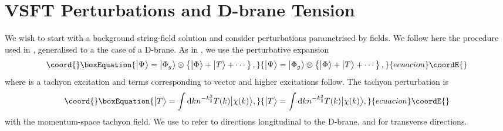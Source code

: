 \documentclass[letterpaper,12pt]{article}
\providecommand{\td}{\textup{d}}
\begin{document}
\section{VSFT Perturbations and D\coordHE{}-brane Tension}
\label{VSFTP}
We wish to start with a background string-field solution \coordHE{} 
and consider perturbations parametrised by fields. We follow here the procedure used 
in \cite{RV}, generalised to a the case of a D\coordHE{}-brane.
 As in \cite{RSZ6}, we use the perturbative expansion
\begin{equation}\coord{}\boxEquation{
\big| \Psi \big\rangle =  \big| \Phi_g \big\rangle \otimes
        \left\{
          \big|\Phi \big\rangle + \big|T\big\rangle + \cdots
        \right\}
,}{
\big| \Psi \big\rangle =  \big| \Phi_g \big\rangle \otimes
        \left\{
          \big|\Phi \big\rangle + \big|T\big\rangle + \cdots
        \right\}
,}{ecuacion}\coordE{}\end{equation}
where \coordHE{} is a tachyon excitation and terms corresponding to vector 
and higher excitations follow.
The tachyon perturbation is
\begin{equation}\coord{}\boxEquation{
 \big|T\big\rangle = \int \td k n^{-k_\parallel^2} T(k) \big|\chi(k)\big\rangle 
,}{
 \big|T\big\rangle = \int \td k n^{-k_\parallel^2} T(k) \big|\chi(k)\big\rangle 
,}{ecuacion}\coordE{}\end{equation}
with \coordHE{} the momentum-space tachyon field. We use \coordHE{} to refer to
directions longitudinal to the D-brane, and \coordHE{} for transverse directions.
\end{document}
